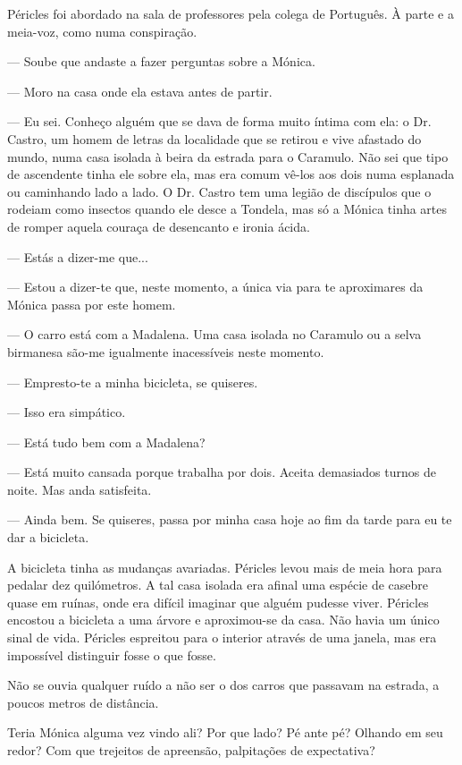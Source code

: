 Péricles foi abordado na sala de professores pela colega de Português. À
parte e a meia-voz, como numa conspiração.

--- Soube que andaste a fazer perguntas sobre a Mónica.

--- Moro na casa onde ela estava antes de partir.

--- Eu sei. Conheço alguém que se dava de forma muito íntima com ela: o
  Dr. Castro, um homem de letras da localidade que se retirou e vive
  afastado do mundo, numa casa isolada à beira da estrada para o
  Caramulo. Não sei que tipo de ascendente tinha ele sobre ela, mas era
  comum vê-los aos dois numa esplanada ou caminhando lado a lado. O Dr.
  Castro tem uma legião de discípulos que o rodeiam como insectos
  quando ele desce a Tondela, mas só a Mónica tinha artes de romper
  aquela couraça de desencanto e ironia ácida.

--- Estás a dizer-me que...

--- Estou a dizer-te que, neste momento, a única via para te aproximares
  da Mónica passa por este homem.

--- O carro está com a Madalena. Uma casa isolada no Caramulo ou a selva
  birmanesa são-me igualmente inacessíveis neste momento.

--- Empresto-te a minha bicicleta, se quiseres.

--- Isso era simpático.

--- Está tudo bem com a Madalena?


--- Está muito cansada porque trabalha por dois. Aceita demasiados turnos
  de noite. Mas anda satisfeita.

--- Ainda bem. Se quiseres, passa por minha casa hoje ao fim da tarde para
  eu te dar a bicicleta.


A bicicleta tinha as mudanças avariadas. Péricles levou mais de meia
hora para pedalar dez quilómetros. A tal casa isolada era afinal uma
espécie de casebre quase em ruínas, onde era difícil imaginar que alguém
pudesse viver. Péricles encostou a bicicleta a uma árvore e aproximou-se
da casa. Não havia um único sinal de vida. Péricles espreitou para o
interior através de uma janela, mas era impossível distinguir fosse o
que fosse.

Não se ouvia qualquer ruído a não ser o dos carros que passavam na
estrada, a poucos metros de distância.

Teria Mónica alguma vez vindo ali? Por que lado? Pé ante pé? Olhando em
seu redor? Com que trejeitos de apreensão, palpitações de expectativa?


